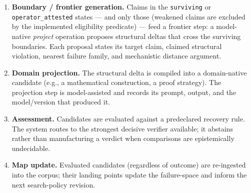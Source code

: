 \documentclass[11pt]{article}
\theoremstyle{gowthm}
\theoremstyle{gowplain}
\begin{document}
\begin{enumerate}[label=\arabic*.]
    than the seven-probe methodology contract and does not synthesize
    counterexamples; the complete seven-probe campaigns reported for N2a and
    N5 were performed as model-assisted, operator-recorded analyses with
    retained artifacts, outside the CLI challenger.
  \item \textbf{Boundary / frontier generation.} Claims in the
    \texttt{surviving} or \texttt{operator\_attested} states --- and only
    those (weakened claims are excluded by the implemented eligibility
    predicate) --- feed a frontier step: a model-native
    \emph{project} operation proposes structural deltas that cross the surviving
    boundaries. Each proposal states its target claim, claimed structural
    violation, nearest failure family, and mechanistic distance argument.
  \item \textbf{Domain projection.} The structural delta is compiled into a
    domain-native candidate (e.g., a mathematical construction, a proof
    strategy). The projection step is model-assisted and records its prompt,
    output, and the model/version that produced it.
  \item \textbf{Assessment.} Candidates are evaluated against a predeclared
    recovery rule. The system routes to the strongest decisive verifier available;
    it abstains rather than manufacturing a verdict when comparisons are
    epistemically undecidable.
  \item \textbf{Map update.} Evaluated candidates (regardless of outcome) are
    re-ingested into the corpus; their landing points update the failure-space
    and inform the next search-policy revision.
\end{enumerate}
\end{document}
